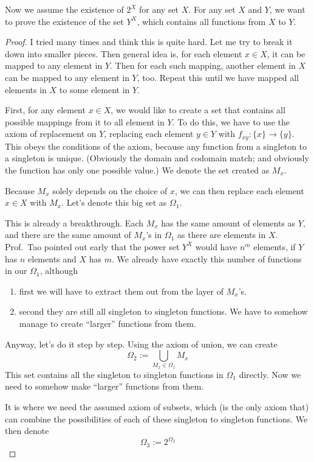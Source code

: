  Now we assume the existence of $2^X$ for any set $X$. For any set $X$ and $Y$, we want to prove the existence of the set $Y^X$, which contains all functions from $X$ to $Y$.
\begin{proof}
	I tried many times and think this is quite hard. Let me try to break it down into smaller pieces. Then general idea is, for each element $x \in X$, it can be mapped to any element in $Y$. Then for each such mapping, another element in $X$ can be mapped to any element in $Y$, too. Repeat this until we have mapped all elements in $X$ to some element in $Y$.
	
	First, for any element $x \in X$, we would like to create a set that contains all possible mappings from it to all element in $Y$. To do this, we have to use the axiom of replacement on $Y$, replacing each element $y \in Y$ with $f_{xy}: \{x\} \to \{y\}$. This obeys the conditions of the axiom, because any function from a singleton to a singleton is unique. (Obviously the domain and codomain match; and obviously the function has only one possible value.) We denote the set created as $M_{x}$.
	
	Because $M_{x}$ solely depends on the choice of $x$, we can then replace each element $x \in X$ with $M_x$. Let's denote this big set as $\Omega_1$.
	
	This is already a breakthrough. Each $M_{x}$ has the same amount of elements as $Y$, and there are the same amount of $M_{x}$'s in $\Omega_1$ as there are elements in $X$. Prof.~Tao pointed out early that the power set $Y^X$ would have $n^m$ elements, if $Y$ has $n$ elements and $X$ has $m$. We already have exactly this number of functions in our $\Omega_1$, although
	\begin{enumerate}
		\item first we will have to extract them out from the layer of $M_{x}$'s.
		\item second they are still all singleton to singleton functions. We have to somehow manage to create ``larger'' functions from them.
	\end{enumerate}

	Anyway, let's do it step by step. Using the axiom of union, we can create
	\[
		\Omega_2 := \bigcup_{M_x \in \Omega_1} M_x
	\]
	This set contains all the singleton to singleton functions in $\Omega_1$ directly. Now we need to somehow make ``larger'' functions from them.
	
	It is where we need the assumed axiom of subsets, which (is the only axiom that) can combine the possibilities of each of these singleton to singleton functions. We then denote
	\[
		\Omega_3 := 2^{\Omega_2}
	\]
	

\end{proof}
